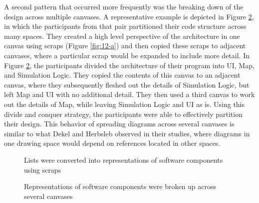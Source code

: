 \documentclass[12pt,fleqn]{ucithesis}
\begin{document}
A second pattern that occurred more frequently was the breaking down of the design across multiple canvases. A representative example is depicted in Figure \ref{fig:12}, in which the participants from that pair partitioned their code structure across many spaces. They created a high level perspective of the architecture in one canvas using scraps (Figure \ref{fig:12-a}) and then copied these scraps to adjacent canvases, where a particular scrap would be expanded to include more detail. In Figure \ref{fig:12}, the participants divided the architecture of their program into UI, Map, and Simulation Logic. They copied the contents of this canvas to an adjacent canvas, where they subsequently fleshed out the details of Simulation Logic, but left Map and UI with no additional detail. They then used a third canvas to work out the details of Map, while leaving Simulation Logic and UI as is. Using this divide and conquer strategy, the participants were able to effectively partition their design. This behavior of spreading diagrams across several canvases is similar to what Dekel and Herbsleb \citep{dekel2007notation} observed in their studies, where diagrams in one drawing space would depend on references located in other spaces. 

\begin{figure}%
  \centering
   \caption {Lists were converted into representations of software components using scraps}
   \label{fig:11}
\end{figure}%

\begin{figure}%
  \centering
   \caption {Representations of software components were broken up across several canvases}
   \label{fig:12}
\end{figure}%
\end{document}
